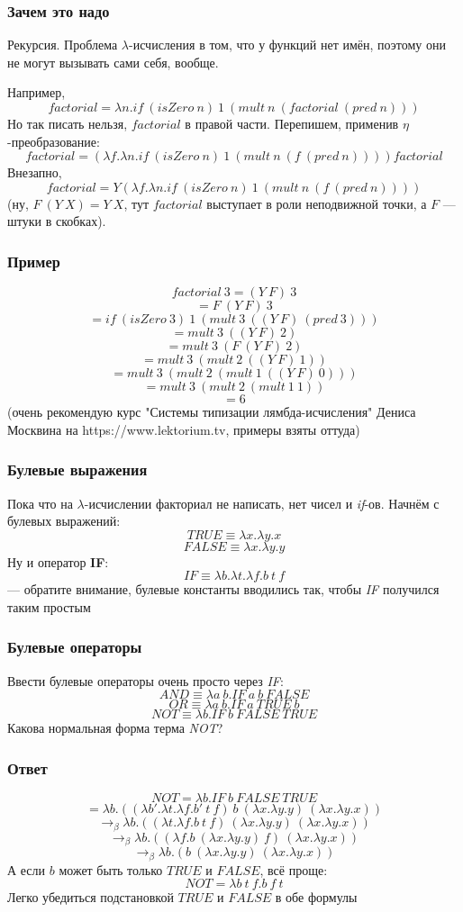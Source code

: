 \documentclass[xetex,mathserif,serif]{beamer}
\begin{document}
	\begin{frame}
		\frametitle{Зачем это надо}
		Рекурсия. Проблема $\lambda$-исчисления в том, что у функций нет имён, поэтому они не могут 
		вызывать сами себя, вообще.
		
		Например,
		$$factorial = \lambda n. if\ (isZero\ n)\ 1\ (mult\ n\ (factorial\ (pred\ n)))$$
		Но так писать нельзя, $factorial$ в правой части. Перепишем, применив $\eta$-преобразование:
		$$factorial = (\lambda f.\lambda n.if\ (isZero\ n)\ 1\ (mult\ n\ (f\ (pred\ n)))) factorial$$
		Внезапно, 
		$$factorial = Y (\lambda f.\lambda n.if\ (isZero\ n)\ 1\ (mult\ n\ (f\ (pred\ n))))$$
		(ну, $F\ (Y\ X) = Y\ X$, тут $factorial$ выступает в роли неподвижной точки, а $F$ --- 
		штуки в скобках).
	\end{frame}

	\begin{frame}
		\frametitle{Пример}
		$$factorial\ 3 = (Y\ F)\ 3$$
		$$= F\ (Y\ F)\ 3$$
		$$= if\ (isZero\ 3)\ 1\ (mult\ 3\ ((Y\ F)\ (pred\ 3)))$$
		$$= mult\ 3\ ((Y\ F)\ 2)$$
		$$= mult\ 3\ (F\ (Y\ F)\ 2)$$
		$$= mult\ 3\ (mult\ 2\ ((Y\ F)\ 1))$$
		$$= mult\ 3\ (mult\ 2\ (mult\ 1\ ((Y\ F)\ 0)))$$
		$$= mult\ 3\ (mult\ 2\ (mult\ 1\ 1))$$
		$$= 6$$
		(очень рекомендую курс "Системы типизации лямбда-исчисления" Дениса Москвина на https://www.lektorium.tv, примеры взяты оттуда)
	\end{frame}

	\begin{frame}
		\frametitle{Булевые выражения}
		Пока что на $\lambda$-исчислении факториал не написать, нет чисел и \textit{if}-ов. Начнём с булевых выражений:
		$$TRUE \equiv \lambda x.\lambda y.x$$
		$$FALSE \equiv \lambda x.\lambda y.y$$
		Ну и оператор \textbf{IF}:
		$$IF \equiv \lambda b.\lambda t.\lambda f.b\ t\ f$$
		--- обратите внимание, булевые константы вводились так, чтобы \textit{IF} получился таким простым
	\end{frame}

	\begin{frame}
		\frametitle{Булевые операторы}
		Ввести булевые операторы очень просто через \textit{IF}:
		$$AND \equiv \lambda a\ b. IF\ a\ b\ FALSE$$
		$$OR \equiv \lambda a\ b. IF\ a\ TRUE\ b$$
		$$NOT \equiv \lambda b.IF\ b\ FALSE\ TRUE$$
		Какова нормальная форма терма \textit{NOT}?
	\end{frame}

	\begin{frame}
		\frametitle{Ответ}
		$$NOT = \lambda b.IF\ b\ FALSE\ TRUE$$
		$$= \lambda b.((\lambda b'.\lambda t.\lambda f.b'\ t\ f)\ b\ (\lambda x.\lambda y.y)\ (\lambda x.\lambda y.x))$$
		$$\rightarrow_\beta \lambda b.((\lambda t.\lambda f.b\ t\ f)\ (\lambda x.\lambda y.y)\ (\lambda x.\lambda y.x))$$
		$$\rightarrow_\beta \lambda b.((\lambda f.b\ (\lambda x.\lambda y.y)\ f)\ (\lambda x.\lambda y.x))$$
		$$\rightarrow_\beta \lambda b.(b\ (\lambda x.\lambda y.y)\ (\lambda x.\lambda y.x))$$
		А если $b$ может быть только $TRUE$ и $FALSE$, всё проще:
		$$NOT = \lambda b\ t\ f.b\ f\ t$$
		Легко убедиться подстановкой $TRUE$ и $FALSE$ в обе формулы
	\end{frame}
\end{document}
